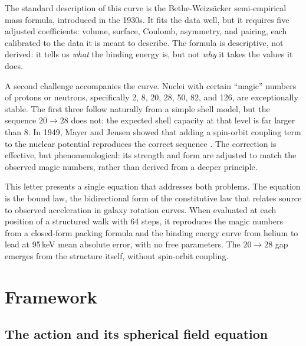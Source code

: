 \documentclass[fleqn,usenatbib]{mnras}
\begin{document}
The standard description of this curve is the Bethe-Weizs\"acker semi-empirical mass formula, introduced in the 1930s. It fits the data well, but it requires five adjusted coefficients: volume, surface, Coulomb, asymmetry, and pairing, each calibrated to the data it is meant to describe. The formula is descriptive, not derived: it tells us \emph{what} the binding energy is, but not \emph{why} it takes the values it does.

A second challenge accompanies the curve. Nuclei with certain ``magic'' numbers of protons or neutrons, specifically 2, 8, 20, 28, 50, 82, and 126, are exceptionally stable. The first three follow naturally from a simple shell model, but the sequence $20\!\to\!28$ does not: the expected shell capacity at that level is far larger than 8. In 1949, Mayer and Jensen showed that adding a spin-orbit coupling term to the nuclear potential reproduces the correct sequence \citep{Mayer1949}. The correction is effective, but phenomenological: its strength and form are adjusted to match the observed magic numbers, rather than derived from a deeper principle.

This letter presents a single equation that addresses both problems. The equation is the bound law, the bidirectional form of the constitutive law that relates source to observed acceleration in galaxy rotation curves. When evaluated at each position of a structured walk with 64 steps, it reproduces the magic numbers from a closed-form packing formula and the binding energy curve from helium to lead at 95\,keV mean absolute error, with no free parameters. The $20\!\to\!28$ gap emerges from the structure itself, without spin-orbit coupling.

\section{Framework}
\label{sec:framework}

\subsection{The action and its spherical field equation}
\label{sec:sst}
\end{document}
